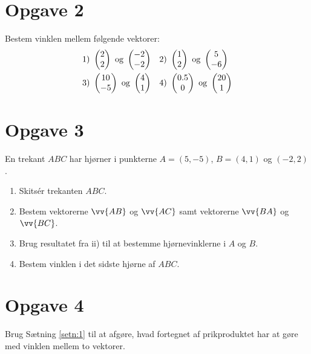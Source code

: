 \section*{Opgave 2}
Bestem vinklen mellem følgende vektorer:
\begin{align*}
&1) \ \begin{pmatrix} 2\\ 2\end{pmatrix} \textnormal{ og } \begin{pmatrix} -2\\ -2\end{pmatrix}  &&2) \ \begin{pmatrix} 1\\ 2\end{pmatrix} \textnormal{ og } \begin{pmatrix} 5\\ -6\end{pmatrix}    \\
&3) \  \begin{pmatrix} 10\\ -5\end{pmatrix} \textnormal{ og } \begin{pmatrix} 4\\ 1\end{pmatrix} &&4) \ \begin{pmatrix} 0.5\\ 0\end{pmatrix} \textnormal{ og } \begin{pmatrix} 20\\ 1\end{pmatrix}    \\
\end{align*}

\section*{Opgave 3}
En trekant $ABC$ har hjørner i punkterne $A = (5,-5)$, $B = (4,1)$ og $(-2,2)$. 
\begin{enumerate}[label=\roman*)]
\item Skitsér trekanten $ABC$.
\item Bestem vektorerne $\vv{AB}$ og $\vv{AC}$ samt vektorerne $\vv{BA}$ og $\vv{BC}$. 
\item Brug resultatet fra ii) til at bestemme hjørnevinklerne i $A$ og $B$.
\item Bestem vinklen i det sidste hjørne af $ABC$.
\end{enumerate}

\section*{Opgave 4}
Brug Sætning \ref{setn:1} til at afgøre, hvad fortegnet af prikproduktet har at gøre med vinklen mellem to vektorer.